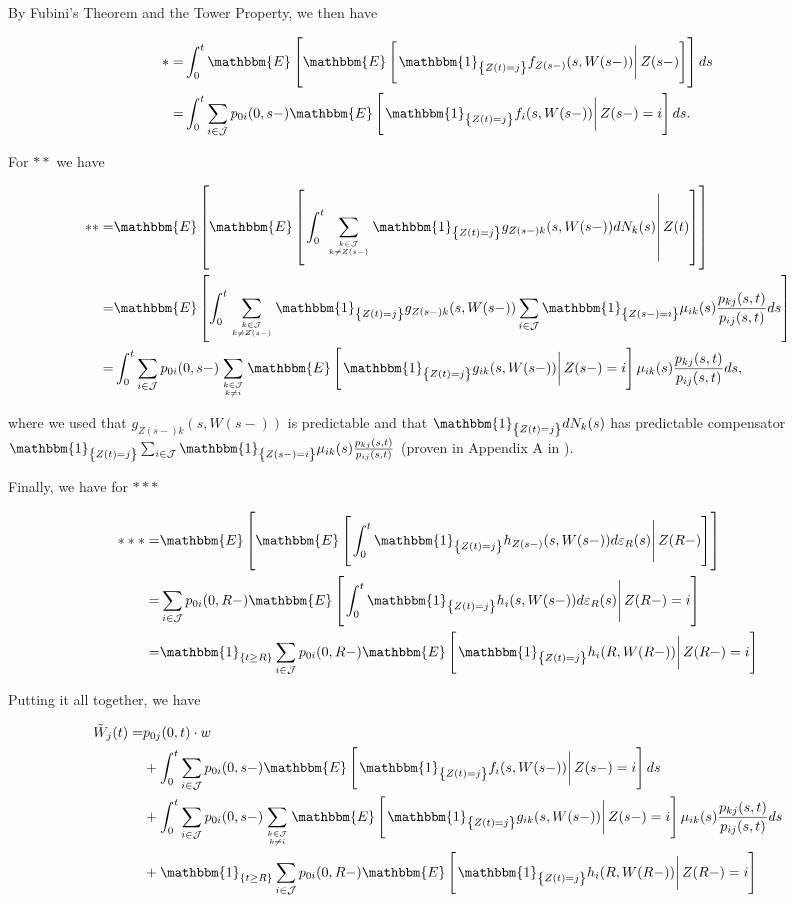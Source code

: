 \documentclass{article}
\newcommand{\1}[1]{\mathbbm{1}_{\left\lbrace #1 \right\rbrace}}
\newcommand{\expec}[1][def]{\mathbbm{E} \left[ #1 \right]}
\newcommand{\econd}[2][def]{\mathbbm{E} \left[ \left. #1 \right| #2 \right]}
\theoremstyle{break}
\theoremstyle{remark}
\numberwithin{equation}{section}
\begin{document}
\begin{appendices}
By Fubini's Theorem and the Tower Property, we then have

\begin{align*}
	* =& \int_0^t \mathbbm{E} \left[ \econd[\1{Z(t)=j} f_{Z(s-)}(s,W(s-))]{Z(s-)} \right] ds \\
	=& \int_0^t \sum_{i \in \mathcal{J}} p_{0i}(0,s-) \econd[\1{Z(t)=j} f_{i}(s,W(s-))]{Z(s-)=i} ds.
\end{align*}

For $**$ we have

\begin{align*}
	** =& \mathbbm{E} \left[ \econd[ \int_0^t \sum_{k \in \mathcal{J} \atop k \neq Z(s-)} \1{Z(t)=j} g_{Z(s-)k}(s,W(s-)) dN_k(s)]{Z(t)} \right] \\
	=& \expec[ \int_0^t \sum_{k \in \mathcal{J} \atop k \neq Z(s-)} \1{Z(t)=j} g_{Z(s-)k}(s,W(s-)) \sum_{i \in \mathcal{J}} \1{Z(s-)=i} \mu_{ik}(s) \frac{p_{kj}(s,t)}{p_{ij}(s,t)} ds] \\
	=& \int_0^t \sum_{i \in \mathcal{J}} p_{0i}(0,s-) \sum_{k \in \mathcal{J} \atop k \neq i} \econd[\1{Z(t)=j} g_{ik}(s,W(s-))]{Z(s-)=i} \mu_{ik}(s) \frac{p_{kj}(s,t)}{p_{ij}(s,t)} ds,
\end{align*}

where we used that $g_{Z(s-)k}(s,W(s-))$ is predictable and that $\1{Z(t)=j}dN_{k}(s)$ has predictable compensator $\1{Z(t)=j} \sum_{i \in \mathcal{J}} \1{Z(s-)=i} \mu_{ik}(s) \frac{p_{kj}(s,t)}{p_{ij}(s,t)}$ (proven in Appendix A in \cite{Lollike}).

Finally, we have for $***$

\begin{align*}
	*** =& \mathbbm{E} \left[ \econd[\int_0^t \1{Z(t)=j} h_{Z(s-)}(s,W(s-)) d \varepsilon_{R}(s)]{Z(R-)} \right] \\
	=& \sum_{i \in \mathcal{J}} p_{0i}(0,R-) \econd[\int_0^t \1{Z(t)=j} h_{i}(s,W(s-)) d \varepsilon_{R}(s)]{Z(R-)=i} \\
	=& \1{t \geq R} \sum_{i \in \mathcal{J}} p_{0i}(0,R-) \econd[\1{Z(t)=j} h_{i}(R,W(R-))]{Z(R-)=i}
\end{align*}

Putting it all together, we have

\begin{align*}
    \tilde{W}_j(t) =& p_{0j}(0,t) \cdot w \\
    &+ \int_0^t \sum_{i \in \mathcal{J}} p_{0i}(0,s-) \econd[\1{Z(t)=j} f_{i}(s,W(s-))]{Z(s-)=i} ds \\
    &+ \int_0^t \sum_{i \in \mathcal{J}} p_{0i}(0,s-) \sum_{k \in \mathcal{J} \atop k \neq i} \econd[\1{Z(t)=j} g_{ik}(s,W(s-))]{Z(s-)=i} \mu_{ik}(s) \frac{p_{kj}(s,t)}{p_{ij}(s,t)} ds \\
    &+ \1{t \geq R} \sum_{i \in \mathcal{J}} p_{0i}(0,R-) \econd[\1{Z(t)=j} h_{i}(R,W(R-))]{Z(R-)=i} \\
\end{align*}


\end{appendices}
\end{document}
